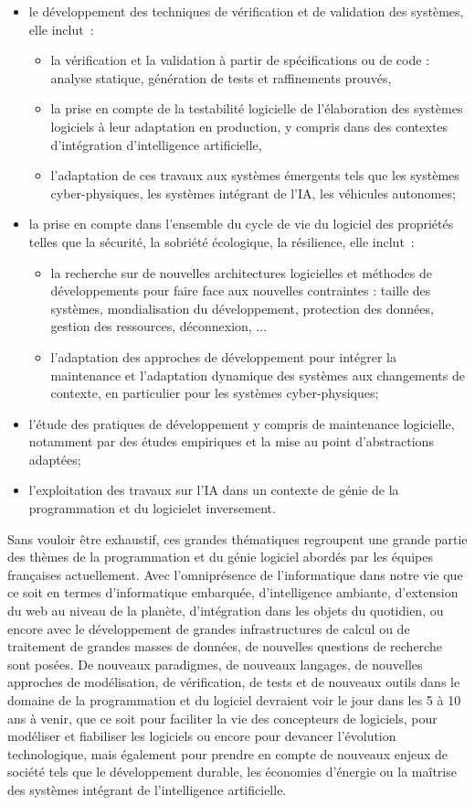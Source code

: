 \documentclass[11pt]{article}
\newcommand{\gpl}[0]{génie de la programmation et du logiciel}
\begin{document}
\begin{itemize}
\item le développement des techniques de vérification et de validation des systèmes, elle inclut~:
\begin{itemize}
\item la vérification et la validation à partir  de spécifications ou de code : analyse statique, génération de tests et raffinements prouvés,
\item la prise en compte de la testabilité logicielle de l'élaboration des systèmes logiciels à leur adaptation en production, y compris dans des contextes d'intégration d'intelligence artificielle, 
\item l'adaptation de ces travaux aux systèmes émergents tels que les systèmes cyber-physiques, les systèmes intégrant de l'IA, les véhicules autonomes;
\end{itemize}
\item la prise en compte dans l'ensemble du cycle de vie du logiciel des propriétés telles que la  sécurité, la sobriété écologique, la résilience, elle inclut~:
\begin{itemize}
\item la recherche sur de nouvelles architectures logicielles et méthodes de développements pour faire face aux nouvelles contraintes : taille des systèmes, mondialisation du développement, protection des données, gestion des ressources, déconnexion, ...
\item l'adaptation des approches de développement pour intégrer la maintenance et l'adaptation dynamique des systèmes aux changements de contexte, en particulier pour les systèmes cyber-physiques;
\end{itemize}
\item l'étude des pratiques de développement y compris de maintenance logicielle, notamment par des études empiriques et la mise au point d'abstractions adaptées;
\item  l'exploitation des travaux sur l'IA dans un contexte de \gpl et inversement.

\end{itemize}

Sans vouloir être exhaustif, ces grandes thématiques regroupent une grande partie des
thèmes de la programmation et du génie logiciel abordés par les équipes
françaises actuellement. 
\noindent
Avec l'omniprésence de l'informatique dans notre vie que ce soit en termes
d'informatique embarquée, d'intelligence ambiante, d'extension du web au niveau
de la planète, d'intégration dans les objets du quotidien, ou encore avec le
développement de grandes infrastructures de calcul ou de traitement de grandes
masses de données, de nouvelles questions de recherche sont posées.
De nouveaux paradigmes, de nouveaux langages, de nouvelles approches de
modélisation, de vérification, de tests et de nouveaux outils dans le domaine
de la programmation et du logiciel devraient voir le jour dans les 5 à 10 ans à
venir, que ce soit pour faciliter la vie des concepteurs de logiciels, pour
modéliser et fiabiliser les logiciels ou encore pour devancer l'évolution
technologique, mais également pour prendre en compte de nouveaux enjeux de
société tels que le développement durable, les économies d'énergie ou la maîtrise des systèmes intégrant de l'intelligence artificielle.
\end{document}
